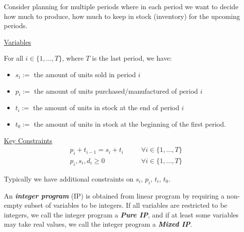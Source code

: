 \begin{exbox}
    \begin{example}
        Consider planning for multiple periods where in each period we
        want to decide how much to produce, how much to keep in stock
        (inventory) for the upcoming periods.

        \underline{Variables}

        For all $ i\in \{1,\ldots,T\} $, where $ T $ is the last period, we have:
        \begin{itemize}
            \item $ s_i:= $ the amount of units sold in period $ i $
            \item $ p_i:= $ the amount of units purchased/manufactured of period $ i $
            \item $ t_i:= $ the amount of units in stock at the end of period $ i $
            \item $ t_0:= $ the amount of units in stock at the beginning of the first period.
        \end{itemize}
        \underline{Key Constraints}
        \begin{align*}
            p_i+t_{i-1}=s_{i}+t_i   & \quad & \forall i\in \{1,\dots,T\} \\
            p_i,s_i,d_i\geqslant  0 &       & \forall i\in \{1,\dots,T\}
        \end{align*}
        \begin{remark}
            Typically we have additional constraints on $s_i,\,p_i,\,t_i,\,t_0$.
        \end{remark}
    \end{example}
\end{exbox}

\begin{defbox}
    \begin{definition}
        An \textbf{\emph{integer program}} (IP) is obtained from linear program
        by requiring a non-empty subset of variables to be integers. If all variables are
        restricted to be integers, we call the integer program a
        \textbf{\emph{Pure IP}}, and if at least some variables may take
        real values, we call the integer program a \textbf{\emph{Mixed IP}}.
    \end{definition}
\end{defbox}
